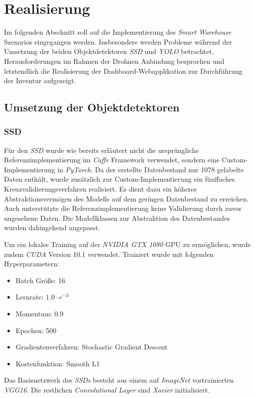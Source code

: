 \chapter{Realisierung}

Im folgenden Abschnitt soll auf die Implementierung des \textit{Smart Warehouse} Szenarios eingegangen werden. Insbesondere werden Probleme während der Umsetzung der beiden Objektdetektoren \textit{SSD} und \textit{YOLO} betrachtet, Herausforderungen im Rahmen der Drohnen Anbindung besprochen und letztendlich die Realisierung der Dashboard-Webapplikation zur Durchführung der Inventur aufgezeigt. 

\section{Umsetzung der Objektdetektoren}

\subsection*{SSD}

Für den \textit{SSD} wurde wie bereits erläutert nicht die ursprüngliche Referenzimplementierung im \textit{Caffe} Framework verwendet, sondern eine Custom-Implementierung in \textit{PyTorch}. Da der erstellte Datenbestand nur 1078 gelabelte Daten enthält, wurde zusätzlich zur Custom-Implementierung ein fünffaches Kreuzvalidierungsverfahren realisiert. Es dient dazu ein höheres Abstraktionsvermögen des Modells auf dem geringen Datenbestand zu erreichen. Auch unterstützte die Referenzimplementierung keine Validierung durch zuvor ungesehene Daten. Die Modellklassen zur Abstraktion des Datenbestandes wurden dahingehend angepasst.

Um ein lokales Training auf der \textit{NVIDIA GTX 1080} GPU zu ermöglichen, wurde zudem \textit{CUDA} Version 10.1 verwendet. Trainiert wurde mit folgenden Hyperparametern:
\begin{itemize}
	\item Batch Größe: 16
	\item Lernrate: $1.0\cdot e^{-3}$
	\item Momentum: 0.9
	\item Epochen: 500
	\item Gradientenverfahren: Stochastic Gradient Descent
	\item Kostenfunktion: Smooth L1
\end{itemize}

Das Basisnetzwerk des \textit{SSDs} besteht aus einem auf \textit{ImageNet} vortrainierten \textit{VGG16}. Die restlichen \textit{Convolutional Layer} sind \textit{Xavier} initialisiert. 

